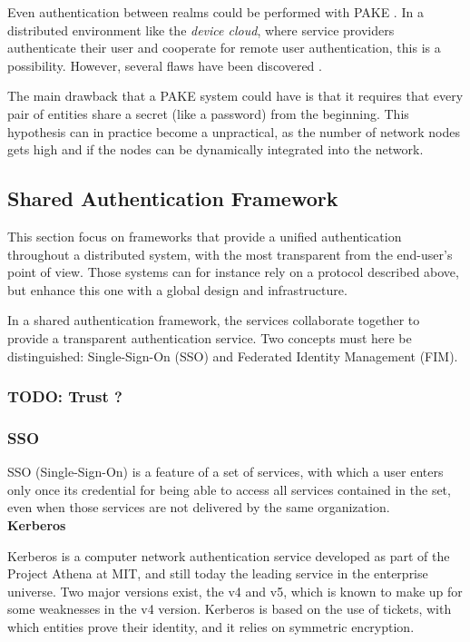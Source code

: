 Even authentication between realms could be performed with PAKE \cite{byun2002password}. In a distributed environment like the \emph{device cloud}, where service providers authenticate their user and cooperate for remote user authentication, this is a possibility. However, several flaws have been discovered \cite{Wang2004}.

The main drawback that a PAKE system could have is that it requires that every pair of entities share a secret (like a password) from the beginning. This hypothesis can in practice become a unpractical, as the number of network nodes gets high and if the nodes can be dynamically integrated into the network.


\subsection{Shared Authentication Framework}
This section focus on frameworks that provide a unified authentication throughout a distributed system, with the most transparent from the end-user's point of view. Those systems can for instance rely on a protocol described above, but enhance this one with a global design and infrastructure. 

In a shared authentication framework, the services collaborate together to provide a transparent authentication service. Two concepts must here be distinguished: Single-Sign-On (SSO) and Federated Identity Management (FIM).

\subsubsection{TODO: Trust ?}

\subsubsection{SSO}
\label{sec:02_SSO}
SSO (Single-Sign-On) is a feature of a set of services, with which a user enters only once its credential for being able to access all services contained in the set, even when those services are not delivered by the same organization.
\\
 
\quad \tabitem	\textbf{Kerberos}

\label{sec:02_Kerberos}
Kerberos\cite{Sundareswaran} is a computer network authentication service developed as part of the Project Athena at MIT, and still today the leading service in the enterprise universe. Two major versions exist, the v4 and v5, which is known to make up for some weaknesses in the v4 version. Kerberos is based on the use of tickets, with which entities prove their identity, and it relies on symmetric encryption.

